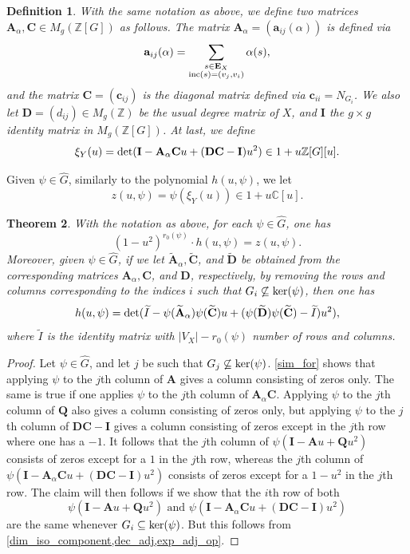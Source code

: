 \documentclass[11pt]{amsart}
\newtheorem{theorem}{Theorem}[section]
\newtheorem{definition}[theorem]{Definition}
\numberwithin{equation}{section}
\theoremstyle{remark}
\theoremstyle{definition}
\begin{document}
\begin{definition} \label{zak_mat}
With the same notation as above, we define two matrices $\mathbf{A}_{\alpha}, \mathbf{C} \in M_{g}(\mathbb{Z}[G])$ as follows.  The matrix $\mathbf{A}_{\alpha} = (\mathbf{a}_{ij}(\alpha))$ is defined via
$$\mathbf{a}_{ij}(\alpha) = \sum_{\substack{s \in \mathbf{E}_{X}\\{\rm inc}(s)=(v_{j},v_{i})}} \alpha(s), $$
and the matrix $\mathbf{C} = (\mathbf{c}_{ij})$ is the diagonal matrix defined via $\mathbf{c}_{ii} = N_{G_{i}}$.  We also let $\mathbf{D} = (d_{ij}) \in M_{g}(\mathbb{Z})$ be the usual degree matrix of $X$, and $\mathbf{I}$ the $g \times g$ identity matrix in $M_{g}(\mathbb{Z}[G])$.  At last, we define
$$\xi_{Y}(u) = {\rm det}(\mathbf{I} - \mathbf{A}_{\alpha}\mathbf{C}u + (\mathbf{D}\mathbf{C} - \mathbf{I})u^{2}) \in 1 + u\mathbb{Z}[G][u]. $$
\end{definition}
Given $\psi \in \widehat{G}$, similarly to the polynomial $h(u,\psi)$, we let 
$$z(u,\psi) = \psi(\xi_{Y}(u)) \in 1 + u\mathbb{C}[u].$$
\begin{theorem} \label{link_zak}
With the notation as above, for each $\psi \in \widehat{G}$, one has
$$(1-u^{2})^{r_{0}(\psi)} \cdot h(u,\psi) = z(u,\psi). $$
Moreover, given $\psi \in \widehat{G}$, if we let $\widetilde{\mathbf{A}}_{\alpha}, \widetilde{\mathbf{C}}$, and $\widetilde{\mathbf{D}}$ be obtained from the corresponding matrices $\mathbf{A}_{\alpha}, \mathbf{C}$, and $\mathbf{D}$, respectively, by removing the rows and columns corresponding to the indices $i$ such that $G_{i} \not \subseteq {\rm ker}(\psi)$, then one has
$$h(u,\psi) = {\rm det}(\widetilde{I} - \psi(\widetilde{\mathbf{A}}_{\alpha})\psi(\widetilde{\mathbf{C}})u + (\psi(\widetilde{\mathbf{D}})\psi(\widetilde{\mathbf{C}}) - \widetilde{I})u^{2}), $$
where $\widetilde{I}$ is the identity matrix with $|V_{X}| - r_{0}(\psi)$ number of rows and columns.
\end{theorem}
\begin{proof}
Let $\psi \in \widehat{G}$, and let $j$ be such that $G_{j} \not \subseteq {\rm ker}(\psi)$.  \cref{sim_for} shows that applying $\psi$ to the $j$th column of $\mathbf{A}$ gives a column consisting of zeros only.  The same is true if one applies $\psi$ to the $j$th column of $\mathbf{A}_{\alpha}\mathbf{C}$.  Applying $\psi$ to the $j$th column of $\mathbf{Q}$ also gives a column consisting of zeros only, but applying $\psi$ to the $j$th column of $\mathbf{D}\mathbf{C} - \mathbf{I}$ gives a column consisting of zeros except in the $j$th row where one has a $-1$.  It follows that the $j$th column of $\psi(\mathbf{I} - \mathbf{A}u + \mathbf{Q}u^{2})$ consists of zeros except for a $1$ in the $j$th row, whereas the $j$th column of $\psi(\mathbf{I} - \mathbf{A}_{\alpha}\mathbf{C}u + (\mathbf{D}\mathbf{C}-\mathbf{I})u^{2})$ consists of zeros except for a $1-u^{2}$ in the $j$th row.  The claim will then follows if we show that the $i$th row of both 
$$\psi(\mathbf{I} - \mathbf{A}u + \mathbf{Q}u^{2}) \text{ and } \psi(\mathbf{I} - \mathbf{A}_{\alpha}\mathbf{C}u + (\mathbf{D}\mathbf{C}-\mathbf{I})u^{2})$$
are the same whenever $G_{i} \subseteq {\rm ker}(\psi)$.  But this follows from \cref{dim_iso_component,dec_adj,exp_adj_op}.
\end{proof}
\end{document}
